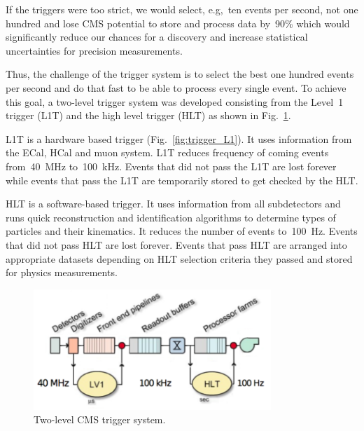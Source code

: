 If the triggers were too strict, we would select, e.g,~ten events per second, not one hundred and lose CMS potential to store and process data by~90\% which would significantly reduce our chances for a discovery and increase statistical uncertainties for precision measurements.

Thus, the challenge of the trigger system is to select the best one hundred events per second and do that fast to be able to process every single event. To achieve this goal, a two-level trigger system was developed consisting from the Level~1 trigger (L1T) and the high level trigger (HLT) as shown in Fig.~\ref{fig:trigger_2level}.

L1T is a hardware based trigger (Fig.~\ref{fig:trigger_L1}). It uses information from the ECal, HCal and muon system. L1T reduces frequency of coming events from~40~MHz to~100~kHz. Events that did not pass the L1T are lost forever while events that pass the L1T are temporarily stored to get checked by the HLT.

HLT is a software-based trigger. It uses information from all subdetectors and runs quick reconstruction and identification algorithms to determine types of particles and their kinematics. It reduces the number of events to~100~Hz. Events that did not pass HLT are lost forever. Events that pass HLT are arranged into appropriate datasets depending on HLT selection criteria they passed and stored for physics measurements.

\begin{figure}[htb]
  \begin{center}
    \includegraphics[width=0.8\textwidth]{../figs/Exp/trigger_2level.png}
    \caption{Two-level CMS trigger system.}
    \label{fig:trigger_2level}
  \end{center}
\end{figure}

